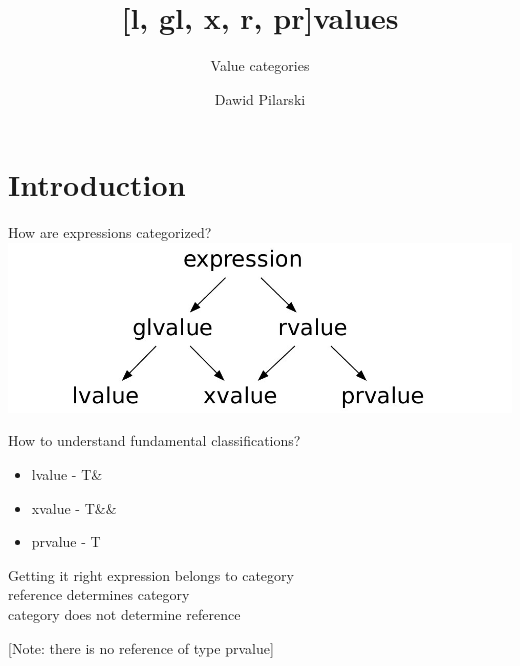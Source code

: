 \documentclass[10pt]{beamer}
\title{[l, gl, x, r, pr]values}
\subtitle{Value categories}
\date{}
\author{Dawid Pilarski}
\institute{dawid.pilarski@tomtom.com}
\begin{document}
\maketitle

\section{Introduction}

\begin{frame}{How are expressions categorized?}
\centering
	\includegraphics[width=\linewidth]{value_categories-1.jpg}
\end{frame}

\begin{frame}{How to understand fundamental classifications?}
	\begin{itemize}
		\item lvalue - T\& \pause
		\item xvalue - T\&\& \pause
		\item prvalue - T
	\end{itemize}
\end{frame}


\begin{frame}{Getting it right}
	\centering
	expression \alert{belongs to} category \\
	reference \alert{determines} category \\
	category \alert{does not determine} reference\\
	
	\vfill
	
	\footnotesize
	[Note: there is no reference of type prvalue]
\end{frame}
\end{document}
